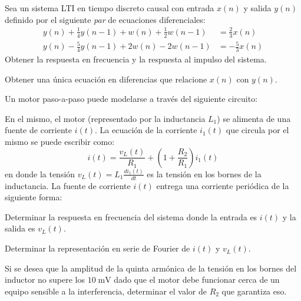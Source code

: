 \begin{ejercicio}
    Sea un sistema LTI en tiempo discreto causal con entrada $x(n)$ y salida $y(n)$ definido por el siguiente \emph{par} de ecuaciones diferenciales:
    \begin{align*}
        y(n) + \frac{1}{4} y(n-1) + w(n) + \frac{1}{2} w(n-1) &= \frac{2}{3} x(n) \\
        y(n) - \frac{5}{4} y(n-1) + 2w(n) - 2 w(n-1) &= -\frac{5}{3} x(n)
    \end{align*}
    \inciso Obtener la respuesta en frecuencia y la respuesta al impulso del sistema.
    
    \inciso Obtener una única ecuación en diferencias que relacione $x(n)$ con $y(n)$.
\end{ejercicio}

\begin{ejercicio}
    Un motor paso-a-paso puede modelarse a través del siguiente circuito:
    \begin{center}
        \parbox{0.5\textwidth}{
            
        }
    \end{center}
    En el mismo, el motor (representado por la inductancia $L_1$) se alimenta de una fuente de corriente $i(t)$. La ecuación de la corriente $i_1(t)$ que circula por el mismo se puede escribir como:
    \begin{equation*}
        i(t) = \frac{v_L(t)}{R_1} + \left(1 + \frac{R_2}{R_1}\right) i_1(t)
    \end{equation*}
    en donde la tensión $v_L(t) = L_1 \frac{d i_1(t)}{dt}$ es la tensión en los bornes de la inductancia. La fuente de corriente $i(t)$ entrega una corriente periódica de la siguiente forma:
    \begin{center}
        \parbox{0.5\textwidth}{
            
        }
    \end{center}
    \inciso Determinar la respuesta en frecuencia del sistema donde la entrada es $i(t)$ y la salida es $v_L(t)$.

    \inciso Determinar la representación en serie de Fourier de $i(t)$ y $v_L(t)$.

    \inciso Si se desea que la amplitud de la quinta armónica de la tensión en los bornes del inductor no supere los $10\;\mathrm{mV}$ dado que el motor debe funcionar cerca de un equipo sensible a la interferencia, determinar el valor de $R_2$ que garantiza eso. 
\end{ejercicio}

